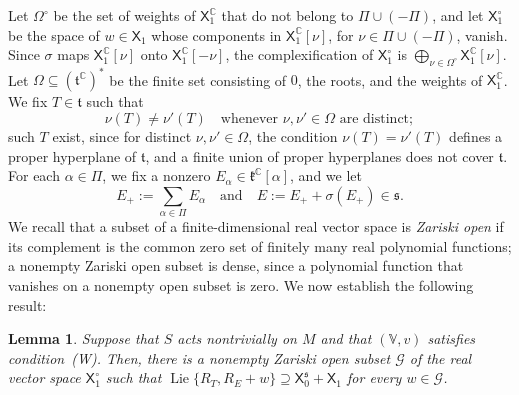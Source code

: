\documentclass{article}
\newcommand{\C}{\mathbb{C}}
\newcommand{\frakk}{\mathfrak{k}}
\newcommand{\fraks}{\mathfrak{s}}
\newcommand{\frakt}{\mathfrak{t}}
\newcommand{\sX}{\mathsf{X}}
\newtheorem{lemma}{Lemma}
\theoremstyle{definition}
\theoremstyle{plain}
\begin{document}
Let $\Omega^\circ$ be the set of weights of $\sX_1^\C$ that do not belong to $\Pi\cup(-\Pi)$, and let $\sX_1^\circ$ be the space of $w\in\sX_1$ whose components in $\sX_1^\C[\nu]$, for $\nu\in\Pi\cup(-\Pi)$, vanish.
Since $\sigma$ maps $\sX_1^\C[\nu]$ onto $\sX_1^\C[-\nu]$, the complexification of $\sX_1^\circ$ is $\bigoplus_{\nu\in\Omega^\circ}\sX_1^\C[\nu]$.
Let $\Omega\subseteq(\frakt^\C)^*$ be the finite set consisting of $0$, the roots, and the weights of $\sX_1^\C$.
We fix $T\in\frakt$ such that
\begin{equation}\label{eq:separation}
\nu(T)\neq\nu'(T)\quad\mbox{whenever }\nu,\nu'\in\Omega\mbox{ are distinct};
\end{equation}
such $T$ exist, since for distinct $\nu,\nu'\in\Omega$, the condition $\nu(T)=\nu'(T)$ defines a proper hyperplane of $\frakt$, and a finite union of proper hyperplanes does not cover $\frakt$.
For each $\alpha\in\Pi$, we fix a nonzero $E_\alpha\in\frakk^\C[\alpha]$, and we let
\begin{equation}\label{eq:E}
E_+:=\sum_{\alpha\in\Pi}E_\alpha
\quad\mbox{and}\quad
E:=E_++\sigma(E_+)\in\fraks.
\end{equation}
We recall that a subset of a finite-dimensional real vector space is {\it Zariski open} if its complement is the common zero set of finitely many real polynomial functions; a nonempty Zariski open subset is dense, since a polynomial function that vanishes on a nonempty open subset is zero.
We now establish the following result:

\begin{lemma}\label{lem:separation}
Suppose that $S$ acts nontrivially on $M$ and that $(\mathbb V,v)$ satisfies condition~(W).
Then, there is a nonempty Zariski open subset $\mathcal G$ of the real vector space $\sX_1^\circ$ such that $\operatorname{Lie}\{R_T,R_E+w\}\supseteq\sX_0^{\fraks}+\sX_1$ for every $w\in\mathcal G$.
\end{lemma}
\end{document}
